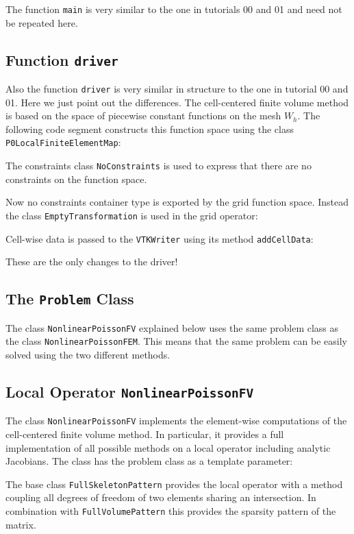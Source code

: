 \documentclass[a4paper,12pt]{article}
\begin{document}
The function \lstinline{main} is very similar to the one in tutorials 00 and 01
and need not be repeated here.

\subsection{Function \lstinline{driver}}

Also the function \lstinline{driver} is very similar in structure to the
one in tutorial 00 and 01. Here we just point out the differences.
The cell-centered finite volume method is based on the space of piecewise
constant functions on the mesh $W_h$. The following code segment
constructs this function space using the class \lstinline{P0LocalFiniteElementMap}:

The constraints class \lstinline{NoConstraints} is used to express that
there are no constraints on the function space.

Now no constraints container type is exported by the grid function space.
Instead the class \lstinline{EmptyTransformation} is used in the grid operator:


Cell-wise data is passed to the \lstinline{VTKWriter}
using its method \lstinline{addCellData}:

These are the only changes to the driver!

\subsection{The \lstinline{Problem} Class}

The class \lstinline{NonlinearPoissonFV} explained below uses
the same problem class as the class \lstinline{NonlinearPoissonFEM}. This means
that the same problem can be easily solved using the two different methods.

\subsection{Local Operator \lstinline{NonlinearPoissonFV}}

The class \lstinline{NonlinearPoissonFV} implements the
element-wise computations of the cell-centered finite volume
method. In particular, it provides a full implementation
of all possible methods on a local operator including
analytic Jacobians. The class has the problem class as a template parameter:

The base class \lstinline{FullSkeletonPattern} provides the local operator
with a method coupling all degrees of freedom of two elements sharing an intersection.
In combination with \lstinline{FullVolumePattern} this provides the sparsity pattern
of the matrix.
\end{document}
